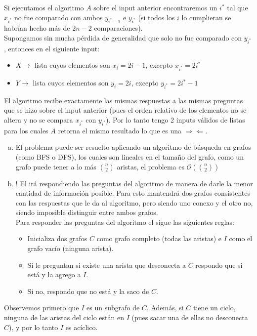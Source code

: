 \documentclass[dcc,uchile]{fcfmcourse}
\theoremstyle{plain}
\theoremstyle{definition}
\begin{document}
\begin{problems}
\begin{enumerate}[a)]
    Si ejecutamos el algoritmo $A$ sobre el input anterior encontraremos un $i^*$ tal que $x_{i^*}$ no fue comparado con ambos $y_{i^*-1}$ e $y_{i^*}$ (si todos los $i$ lo cumplieran se habrían hecho más de $2n-2$ comparaciones).\\
    Supongamos sin mucha pérdida de generalidad que solo no fue comparado con $y_{i^*}$, entonces en el siguiente input:
    \begin{itemize}
        \item $X \rightarrow$ lista cuyos elementos son $x_{i} = 2i-1$, excepto $x_{i^*} = 2i^*$
        \item $Y \rightarrow$ lista cuyos elementos son $y_{i} = 2i$, excepto $y_{i^*} = 2i^*-1$
    \end{itemize}
    El algoritmo recibe exactamente las mismas respuestas a las mismas preguntas que se hizo sobre el input anterior (pues el orden relativo de los elementos no se altera y no se compara $x_{i^*}$ con $y_{i^*}$). Por lo tanto tengo 2 inputs válidos de listas para los cuales $A$ retorna el mismo resultado lo que es una $\Rightarrow \Leftarrow$.
\end{enumerate}
\begin{enumerate}[a)]
    \item El problema puede ser resuelto aplicando un algoritmo de búsqueda en grafos (como BFS o DFS), los cuales son lineales en el tamaño del grafo, como un grafo puede tener a lo más $\binom{n}{2}$ aristas, el problema es $\mathcal{O}(\binom{n}{2})$ \flash
    \item \idea ! El \demon irá respondiendo las preguntas del algoritmo de manera de darle la menor cantidad de información posible. Para esto mantendrá dos grafos consistentes con las respuestas que le da al algoritmo, pero siendo uno conexo y el otro no, siendo imposible distinguir entre ambos grafos.\\
    
    Para responder las preguntas del algoritmo el \demon sigue las siguientes reglas:
    \begin{itemize}
        \item Inicializa dos grafos $C$ como grafo completo (todas las aristas) e $I$ como el grafo vacío (ninguna arista).
        \item Si le preguntan si existe una arista que desconecta a $C$ respondo que si está y la agrego a $I$.
        \item Si no, respondo que no está y la saco de $C$.
    \end{itemize}
\end{enumerate}
Observemos primero que $I$ es un subgrafo de $C$. Además, si $C$ tiene un ciclo, ninguna de las aristas del ciclo están en $I$ (pues sacar una de ellas no desconecta $C$), y por lo tanto $I$ es acíclico.\\


\end{problems}
\end{document}
